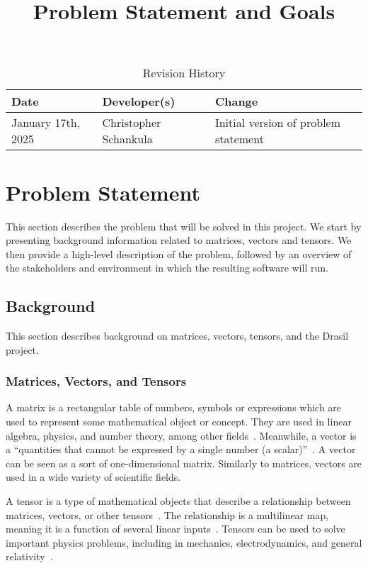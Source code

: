 \documentclass{article}
\title{Problem Statement and Goals\\\progname}
\author{\authname}
\date{}
\begin{document}
\maketitle

\begin{table}[hp]
\caption{Revision History} \label{TblRevisionHistory}
\begin{tabularx}{\textwidth}{llX}
\toprule
\textbf{Date} & \textbf{Developer(s)} & \textbf{Change}\\
\midrule
January 17th, 2025 & Christopher Schankula & Initial version of problem statement\\
\bottomrule
\end{tabularx}
\end{table}

\section{Problem Statement}

This section describes the problem that will be solved in this project. We start by
presenting background information related to matrices, vectors and tensors. We then
provide a high-level description of the problem, followed by an overview of the
stakeholders and environment in which the resulting software will run.

\subsection{Background}

This section describes background on matrices, vectors, tensors, and the Drasil
project.

\subsubsection{Matrices, Vectors, and Tensors}

A matrix is a rectangular table of numbers, symbols or expressions which
are used to represent some mathematical object or concept. They are used in
linear algebra, physics, and number theory, among other 
fields~\cite{Wikipedia_Matrix_2025}. Meanwhile, a vector is a ``quantities that 
cannot be expressed by a single number (a scalar)''~\cite{Wikipedia_Vectors_2024}.
A vector can be seen as a sort of one-dimensional matrix. Similarly to matrices,
vectors are used in a wide variety of scientific fields.

A tensor is a type of mathematical objects that describe a relationship
between matrices, vectors, or other tensors~\cite{Wikipedia_Tensors_2025}. 
The relationship is a multilinear map, meaning it is a function of several 
linear inputs~\cite{Wikipedia_Multilinear_2024}. Tensors can be used to solve
important physics problems, including in mechanics, electrodynamics, and general
relativity~\cite{Wikipedia_Tensors_2025}.
\end{document}
